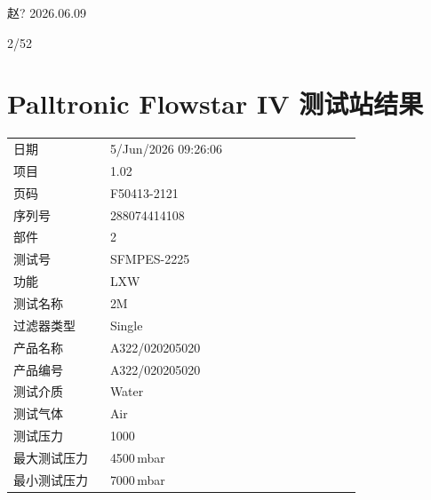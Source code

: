\documentclass[UTF8,10pt,a4paper,fontset=fandol]{ctexart}
\newcommand{\fieldvalue}[1]{#1}
\newcommand{\handwritten}[1]{#1}
\begin{document}
\vspace{1em}

\handwritten{赵? 2026.06.09}

\vspace{0.5em}

\handwritten{2/52}

\newpage

\section{Palltronic Flowstar IV 测试站结果}

\begin{tabular}{@{}p{0.25\linewidth}p{0.65\linewidth}@{}}
日期 &
\fieldvalue{5/Jun/2026 09:26:06}
\\[2pt]
项目 &
\fieldvalue{1.02}
\\[2pt]
页码 &
\fieldvalue{F50413-2121}
\\[2pt]
序列号 &
\fieldvalue{288074414108}
\\[2pt]
部件 &
\fieldvalue{2}
\\[2pt]
测试号 &
\fieldvalue{SFMPES-2225}
\\[2pt]
功能 &
\fieldvalue{LXW}
\\[2pt]
测试名称 &
\fieldvalue{2M}
\\[2pt]
过滤器类型 &
\fieldvalue{Single}
\\[2pt]
产品名称 &
\fieldvalue{A322/020205020}
\\[2pt]
产品编号 &
\fieldvalue{A322/020205020}
\\[2pt]
测试介质 &
\fieldvalue{Water}
\\[2pt]
测试气体 &
\fieldvalue{Air}
\\[2pt]
测试压力 &
\fieldvalue{1000}
\\[2pt]
最大测试压力 &
\fieldvalue{4500\,mbar}
\\[2pt]
最小测试压力 &
\fieldvalue{7000\,mbar}
\end{tabular}
\end{document}
